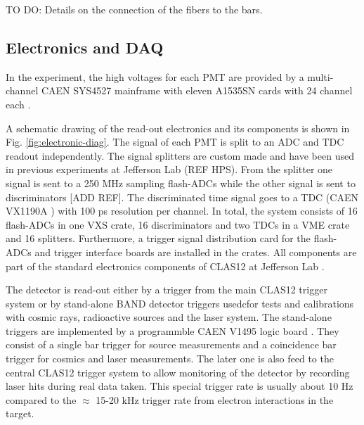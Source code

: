 \documentclass[3p,final,twocolumn]{elsarticle}
\begin{document}
{\color{red} TO DO: Details on the connection of the fibers to the bars.}

\subsection{Electronics and DAQ}
In the experiment, the high voltages for each PMT are provided by a multi-channel CAEN SYS4527 mainframe with eleven A1535SN cards with 24 channel each \cite{caen-hvframe,caen-hvcard}.

A schematic drawing of the read-out electronics and its components is shown in Fig. \ref{fig:electronic-diag}. The signal of each PMT is split to an ADC and TDC readout independently. 
The signal splitters are custom made and have been used in previous experiments at Jefferson Lab (REF HPS).
From the splitter one signal is sent to a 250 \si{\mega\hertz} sampling flash-ADCs \cite{fadc-manual} while the other signal is sent to  discriminators [ADD REF].
The discriminated time signal goes to a TDC (CAEN VX1190A \cite{caen-tdc}) with 100 ps resolution per channel. 
In total, the system consists of 16 flash-ADCs in one VXS crate, 16 discriminators and two TDCs in a VME crate and 16 splitters.  Furthermore, a trigger signal distribution card for the flash-ADCs and trigger interface boards are installed in the crates. All components are part of the standard electronics components of CLAS12 at Jefferson Lab \cite{clas12-daq, clas12-trigger}.

The detector is read-out either by a trigger from the main CLAS12 trigger system \cite{clas12-trigger} or by stand-alone BAND detector triggers usedcfor tests and calibrations with cosmic rays, radioactive sources and the laser system. The stand-alone triggers are implemented by a programmble CAEN V1495 logic board \cite{caen-logicboard}. They consist of a single bar trigger for source measurements and a coincidence bar trigger for cosmics and laser measurements. The later one is also feed to the central CLAS12 trigger system to allow monitoring of the detector by recording laser hits during real data taken. This special trigger rate is usually about 10 \si{\hertz} compared to the $\approx$ 15-20 \si{\kilo\hertz} trigger rate from electron interactions in the target.
\end{document}
